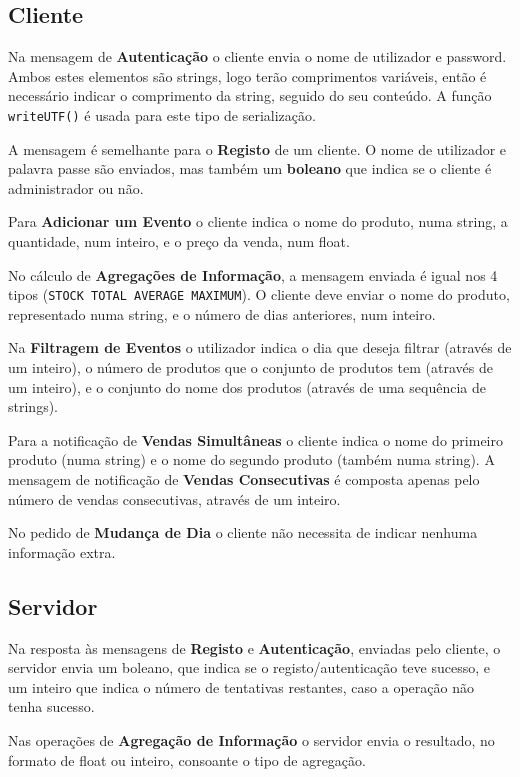\documentclass[11pt, a4paper, fleqn]{article}
\begin{document}
	
	\subsection{Cliente}
	
	Na mensagem de \textbf{Autenticação} o cliente envia o nome de utilizador e password. Ambos estes elementos são strings, logo terão comprimentos variáveis, então é necessário indicar o comprimento da string, seguido do seu conteúdo. A função \texttt{writeUTF()} é usada para este tipo de serialização.
	
	A mensagem é semelhante para o \textbf{Registo} de um cliente. O nome de utilizador e palavra passe são enviados, mas também um \textbf{boleano} que indica se o cliente é administrador ou não.
	
	Para \textbf{Adicionar um Evento} o cliente indica o nome do produto, numa string, a quantidade, num inteiro, e o preço da venda, num float.
	
	No cálculo de \textbf{Agregações de Informação}, a mensagem enviada é igual nos 4 tipos (\texttt{STOCK TOTAL AVERAGE MAXIMUM}). O cliente deve enviar o nome do produto, representado numa string, e o número de dias anteriores, num inteiro.
	
	Na \textbf{Filtragem de Eventos} o utilizador indica o dia que deseja filtrar (através de um inteiro), o número de produtos que o conjunto de produtos tem (através de um inteiro), e o conjunto do nome dos produtos (através de uma sequência de strings).
	
	Para a notificação de \textbf{Vendas Simultâneas} o cliente indica o nome do primeiro produto (numa string) e o nome do segundo produto (também numa string). A mensagem de notificação de \textbf{Vendas Consecutivas} é composta apenas pelo número de vendas consecutivas, através de um inteiro.
	
	No pedido de \textbf{Mudança de Dia} o cliente não necessita de indicar nenhuma informação extra.
	
	
	\subsection{Servidor}
	
	Na resposta às mensagens de \textbf{Registo} e \textbf{Autenticação}, enviadas pelo cliente, o servidor envia um boleano, que indica se o registo/autenticação teve sucesso, e um inteiro que indica o número de tentativas restantes, caso a operação não tenha sucesso.
	
	Nas operações de \textbf{Agregação de Informação} o servidor envia o resultado, no formato de float ou inteiro, consoante o tipo de agregação.
	
\end{document}
